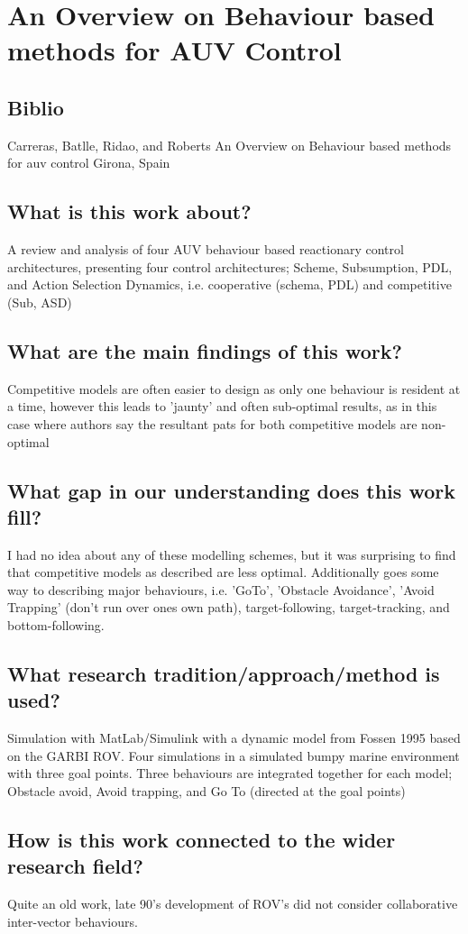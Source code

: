 \documentclass[a4paper]{report}
\begin{document}
\section{An Overview on Behaviour based methods for AUV Control \cite{Carreras2000}}
\subsection{Biblio}
Carreras, Batlle, Ridao, and Roberts
An Overview on Behaviour based methods for auv control
Girona, Spain
\subsection{What is this work about?}
A review and analysis of four AUV behaviour based reactionary control architectures, presenting four control architectures; Scheme, Subsumption, PDL, and Action Selection Dynamics, i.e. cooperative (schema, PDL) and competitive (Sub, ASD)
\subsection{What are the main findings of this work?}
Competitive models are often easier to design as only one behaviour is resident at a time, however this leads to 'jaunty' and often sub-optimal results, as in this case where authors say the resultant pats for both competitive models are non-optimal
\subsection{What gap in our understanding does this work fill?}
I had no idea about any of these modelling schemes, but it was surprising to find that competitive models as described are less optimal.
Additionally goes some way to describing major behaviours, i.e. 'GoTo', 'Obstacle Avoidance', 'Avoid Trapping' (don't run over ones own path), target-following, target-tracking, and bottom-following.
\subsection{What research tradition/approach/method is used?}
Simulation with MatLab/Simulink with a dynamic model from Fossen 1995 based on the GARBI ROV.
Four simulations in a simulated bumpy marine environment with three goal points. Three behaviours are integrated together for each model; Obstacle avoid, Avoid trapping, and Go To (directed at the goal points)
\subsection{How is this work connected to the wider research field?}
Quite an old work, late 90's development of ROV's did not consider collaborative inter-vector behaviours.
\end{document}
